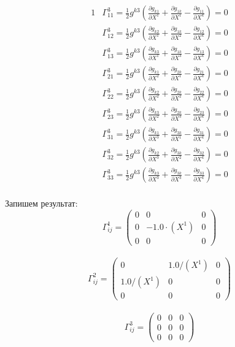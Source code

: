 \documentclass{article}
\begin{document}
\begin{alignat*}{1}
  & \Gamma^3_{11} = \frac{1}{2}g^{k3}(\frac{\partial g_{k1}}{\partial X^1} + \frac{\partial g_{1k}}{\partial X^1} - \frac{\partial g_{11}}{\partial X^k}) = 0 \\
  & \Gamma^3_{12} = \frac{1}{2}g^{k3}(\frac{\partial g_{k2}}{\partial X^1} + \frac{\partial g_{1k}}{\partial X^2} - \frac{\partial g_{12}}{\partial X^k}) = 0 \\
  & \Gamma^3_{13} = \frac{1}{2}g^{k3}(\frac{\partial g_{k3}}{\partial X^1} + \frac{\partial g_{1k}}{\partial X^3} - \frac{\partial g_{13}}{\partial X^k}) = 0 \\
  & \Gamma^3_{21} = \frac{1}{2}g^{k3}(\frac{\partial g_{k1}}{\partial X^2} + \frac{\partial g_{2k}}{\partial X^1} - \frac{\partial g_{21}}{\partial X^k}) = 0 \\
  & \Gamma^3_{22} = \frac{1}{2}g^{k3}(\frac{\partial g_{k2}}{\partial X^2} + \frac{\partial g_{2k}}{\partial X^2} - \frac{\partial g_{22}}{\partial X^k}) = 0 \\
  & \Gamma^3_{23} = \frac{1}{2}g^{k3}(\frac{\partial g_{k3}}{\partial X^2} + \frac{\partial g_{2k}}{\partial X^3} - \frac{\partial g_{23}}{\partial X^k}) = 0 \\
  & \Gamma^3_{31} = \frac{1}{2}g^{k3}(\frac{\partial g_{k1}}{\partial X^3} + \frac{\partial g_{3k}}{\partial X^1} - \frac{\partial g_{31}}{\partial X^k}) = 0 \\
  & \Gamma^3_{32} = \frac{1}{2}g^{k3}(\frac{\partial g_{k2}}{\partial X^3} + \frac{\partial g_{3k}}{\partial X^2} - \frac{\partial g_{32}}{\partial X^k}) = 0 \\
  & \Gamma^3_{33} = \frac{1}{2}g^{k3}(\frac{\partial g_{k3}}{\partial X^3} + \frac{\partial g_{3k}}{\partial X^3} - \frac{\partial g_{33}}{\partial X^k}) = 0 
\end{alignat*}\\
Запишем результат:\\
\[
\Gamma^1_{ij} = \begin{pmatrix}
	0 & 0 & 0\\
	0 & -1.0\cdot (X^1) & 0\\
	0 & 0 & 0
\end{pmatrix}
\]\\
\[
\Gamma^2_{ij} = \begin{pmatrix}
	0 & 1.0/(X^1) & 0\\
	1.0/(X^1) & 0 & 0\\
	0 & 0 & 0
\end{pmatrix}
\]\\
\[
\Gamma^3_{ij} = \begin{pmatrix}
	0 & 0 & 0\\
	0 & 0 & 0\\
	0 & 0 & 0
\end{pmatrix}
\]\\
\end{document}
